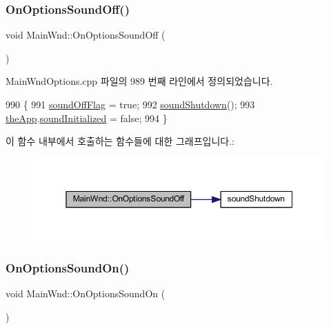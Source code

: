 \subsubsection{\texorpdfstring{On\+Options\+Sound\+Off()}{OnOptionsSoundOff()}}
{\footnotesize\ttfamily void Main\+Wnd\+::\+On\+Options\+Sound\+Off (\begin{DoxyParamCaption}{ }\end{DoxyParamCaption})\hspace{0.3cm}{\ttfamily [protected]}}



Main\+Wnd\+Options.\+cpp 파일의 989 번째 라인에서 정의되었습니다.


\begin{DoxyCode}
990 \{
991   \mbox{\hyperlink{gb_sound_8cpp_a2ff51b8fba1a4efea2d3d72f93210375}{soundOffFlag}} = \textcolor{keyword}{true};
992   \mbox{\hyperlink{gb_sound_8cpp_a2f94fcc352d566069ad4cee1e9a62a39}{soundShutdown}}();
993   \mbox{\hyperlink{_v_b_a_8cpp_a8095a9d06b37a7efe3723f3218ad8fb3}{theApp}}.\mbox{\hyperlink{class_v_b_a_ab183a69bf3da1ebd78a3dc115071e592}{soundInitialized}} = \textcolor{keyword}{false};
994 \}
\end{DoxyCode}
이 함수 내부에서 호출하는 함수들에 대한 그래프입니다.\+:
\nopagebreak
\begin{figure}[H]
\begin{center}
\leavevmode
\includegraphics[width=350pt]{class_main_wnd_a4d0172fc524e4d24d039ac5050acf160_cgraph}
\end{center}
\end{figure}
\mbox{\label{class_main_wnd_a98e970e0bfd8e8bdfd58b5bf6068d75f}} 
\subsubsection{\texorpdfstring{On\+Options\+Sound\+On()}{OnOptionsSoundOn()}}
{\footnotesize\ttfamily void Main\+Wnd\+::\+On\+Options\+Sound\+On (\begin{DoxyParamCaption}{ }\end{DoxyParamCaption})\hspace{0.3cm}{\ttfamily [protected]}}



